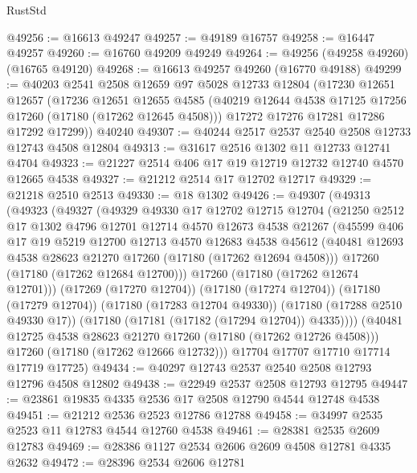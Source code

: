 \begin{lexlean}{RustStd}
\begin{coremodule}
@49256 := @16613 @49247
@49257 := @49189 @16757
@49258 := @16447 @49257
@49260 := @16760 @49209 @49249
@49264 := @49256 (@49258 @49260) (@16765 @49120)
@49268 := @16613 @49257 @49260 (@16770 @49188)
@49299 := @40203
    @2541
    @2508
    @12659
    @97
    @5028
    @12733
    @12804
    (@17230
      @12651
      @12657
      (@17236
        @12651
        @12655
        @4585
        (@40219 @12644 @4538 @17125 @17256 @17260 (@17180 (@17262 @12645 @4508)))
        @17272
        @17276
        @17281
        @17286
        @17292
        @17299))
    @40240
@49307 := @40244 @2517 @2537 @2540 @2508 @12733 @12743 @4508 @12804
@49313 := @31617 @2516 @1302 @11 @12733 @12741 @4704
@49323 := @21227 @2514 @406 @17 @19 @12719 @12732 @12740 @4570 @12665 @4538
@49327 := @21212 @2514 @17 @12702 @12717
@49329 := @21218 @2510 @2513
@49330 := @18 @1302
@49426 := @49307
    (@49313
      (@49323
        (@49327
          (@49329
            @49330
            @17
            @12702
            @12715
            @12704
            (@21250
              @2512
              @17
              @1302
              @4796
              @12701
              @12714
              @4570
              @12673
              @4538
              @21267
              (@45599
                @406
                @17
                @19
                @5219
                @12700
                @12713
                @4570
                @12683
                @4538
                @45612
                (@40481 @12693 @4538 @28623 @21270 @17260 (@17180 (@17262 @12694 @4508)))
                @17260
                (@17180 (@17262 @12684 @12700)))
              @17260
              (@17180 (@17262 @12674 @12701)))
            (@17269 (@17270 @12704))
            (@17180 (@17274 @12704))
            (@17180 (@17279 @12704))
            (@17180 (@17283 @12704 @49330))
            (@17180 (@17288 @2510 @49330 @17))
            (@17180 (@17181 (@17182 (@17294 @12704)) @4335))))
        (@40481 @12725 @4538 @28623 @21270 @17260 (@17180 (@17262 @12726 @4508)))
        @17260
        (@17180 (@17262 @12666 @12732)))
      @17704
      @17707
      @17710
      @17714
      @17719
      @17725)
@49434 := @40297 @12743 @2537 @2540 @2508 @12793 @12796 @4508 @12802
@49438 := @22949 @2537 @2508 @12793 @12795
@49447 := @23861 @19835 @4335 @2536 @17 @2508 @12790 @4544 @12748 @4538
@49451 := @21212 @2536 @2523 @12786 @12788
@49458 := @34997 @2535 @2523 @11 @12783 @4544 @12760 @4538
@49461 := @28381 @2535 @2609 @12783
@49469 := @28386 @1127 @2534 @2606 @2609 @4508 @12781 @4335 @2632
@49472 := @28396 @2534 @2606 @12781

\end{coremodule}
\end{lexlean}
